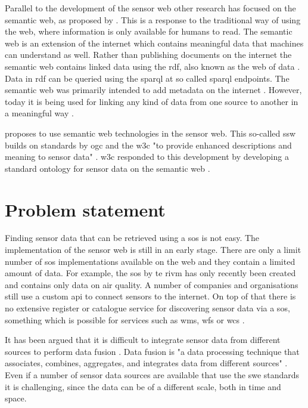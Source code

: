 Parallel to the development of the sensor web other research has focused on the semantic web, as proposed by \cite{LD:Berners-lee}. This is a response to the traditional way of using the web, where information is only available for humans to read. The semantic web is an extension of the internet which contains meaningful data that machines can understand as well. Rather than publishing documents on the internet the semantic web contains linked data using the \ac{rdf}, also known as the web of data \citep{LD:Bizer}. Data in \ac{rdf} can be queried using the \ac{sparql} at so called \ac{sparql} endpoints. The semantic web was primarily intended to add metadata on the internet \cite{LD:W3C}. However, today it is being used for linking any kind of data from one source to another in a meaningful way \citep{LD:Cambridge}. 

\cite{SSW:Sheth} proposes to use semantic web technologies in the sensor web. This so-called \ac{ssw} builds on standards by \ac{ogc} and the \ac{w3c} "to provide enhanced descriptions and meaning to sensor data" \cite[p.78]{SSW:Sheth}. \ac{w3c} responded to this development by developing a standard ontology for sensor data on the semantic web \citep{SSW:SSN_incubatorGroup}. 
 
\section{Problem statement}
Finding sensor data that can be retrieved using a \ac{sos} is not easy. The implementation of the sensor web is still in an early stage. There are only a limit number of \ac{sos} implementations available on the web and they contain a limited amount of data. For example, the \ac{sos} by te \ac{rivm} has only recently been created and contains only data on air quality. A number of companies and organisations still use a custom \ac{api} to connect sensors to the internet. On top of that there is no extensive register or catalogue service for discovering sensor data via a \ac{sos}, something which is possible for services such as \ac{wms}, \ac{wfs} or \ac{wcs} \citep{SDI:OGC2}.

It has been argued that it is difficult to integrate sensor data from different sources to perform data fusion \citep{SSW:Corcho, SSW:Ji, SSW:Wang}. Data fusion is "a data processing technique that associates, combines, aggregates, and integrates data from different sources" \cite[p. 2]{SSW:Wang2}. Even if a number of sensor data sources are available that use the \ac{swe} standards it is challenging, since the data can be of a different scale, both in time and space. 

